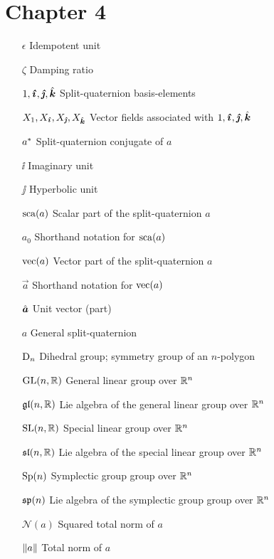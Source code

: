 \section*{Chapter 4}
\begin{itemize}[itemsep=0pt, leftmargin=3.4cm, labelsep=0cm, labelwidth=3.3cm, align=left]
    \item[$\epsilon$] Idempotent unit
    \item[$\zeta$] Damping ratio
%
    \item[$1,\quati,\quatj,\quatk$] Split-quaternion basis-elements
    \item[$X_1, X_{\quati}, X_{\quatj}, X_{\quatk}$] Vector fields associated with $1, \quati, \quatj, \quatk$
    \item[$a^*$] Split-quaternion conjugate of $a$
    \item[$\ii$] Imaginary unit
    \item[$\jj$] Hyperbolic unit
    \item[$\mathrm{sca}\qty(a)$] Scalar part of the split-quaternion $a$
    \item[$a_0$] Shorthand notation for $\mathrm{sca}\qty(a)$
    \item[$\mathrm{vec}\qty(a)$] Vector part of the split-quaternion $a$
    \item[$\vec{a}$] Shorthand notation for $\mathrm{vec}\qty(a)$
    \item[$\uvec{a}$] Unit vector (part)
    \item[$a$] General split-quaternion
%
%
    \item[$\mathrm{D}_n$] Dihedral group; symmetry group of an $n$-polygon
    \item[$\mathrm{GL}(n, \mathbb{R})$] General linear group over $\mathbb{R}^n$
    \item[$\mathfrak{gl}(n, \mathbb{R})$] Lie algebra of the general linear group over $\mathbb{R}^n$
    \item[$\mathrm{SL}(n, \mathbb{R})$] Special linear group over $\mathbb{R}^n$
    \item[$\mathfrak{sl}(n, \mathbb{R})$] Lie algebra of the special linear group over $\mathbb{R}^n$
    \item[$\mathrm{Sp}(n)$] Symplectic group group over $\mathbb{R}^n$
    \item[$\mathfrak{sp}(n)$] Lie algebra of the symplectic group group over $\mathbb{R}^n$
%
    \item[$\mathscr{N}(a)$]  Squared total norm of $a$
    \item[$\norm{a}$]  Total norm of $a$

\end{itemize}
